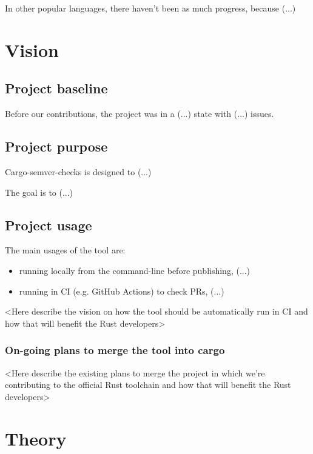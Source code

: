 \documentclass[licencjacka,en]{pracamgr}
\begin{document}
In other popular languages, there haven't been as much progress, because (...)



\chapter{Vision}\label{r:vision}

\section{Project baseline}

Before our contributions, the project was in a (...) state
with (...) issues.


\section{Project purpose}

Cargo-semver-checks is designed to (...)

The goal is to (...)


\section{Project usage}

The main usages of the tool are:
\begin{itemize}
	\item running locally from the command-line before publishing, (...)
	\item running in CI (e.g. GitHub Actions) to check PRs, (...)
\end{itemize}

<Here describe the vision on how the tool should be automatically run in CI
and how that will benefit the Rust developers>


\subsection{On-going plans to merge the tool into cargo}

<Here describe the existing plans to merge the project in which we're contributing
to the official Rust toolchain and how that will benefit the Rust developers>



\chapter{Theory}\label{r:theory}
\end{document}

